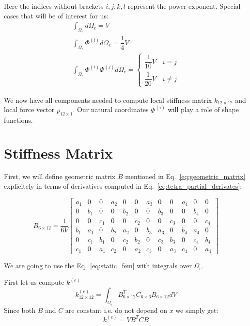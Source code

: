 \documentclass[en]{minipw} %
\begin{document}
Here the indices without brackets $i,j,k,l$ represent the power exponent.
Special cases that will be of interest for us:
\begin{equation}
\label{eq:anal_intergral}
\begin{aligned}
\int_{\Omega_{e}} d \Omega_{e} = V
\\
\int_{\Omega_{e}} \Phi^{(i)} d \Omega_{e} = \dfrac{1}{4}V
\\
\int_{\Omega_{e}} \Phi^{(i)} \Phi^{(j)} d \Omega_{e} = 
\begin{cases}
\dfrac{1}{10} V \quad i = j 
\\
\dfrac{1}{20} V \quad i \neq j
\end{cases}
\end{aligned}
\end{equation}

We now have all components needed to compute local stiffness matrix $k_{12 \times 12}$ and local force vector $p_{12 \times 1}$. Our natural coordinates $\Phi^{(i)}$ will play a role of shape functions.

\section{Stiffness Matrix}

First, we will define geometric matrix $B$ mentioned in Eq.~\ref{eq:geometric_matrix} explicitely in terms of derivatives computed in Eq.~\ref{eq:tetra_partial_derivates}:

\begin{equation}
\label{eq:geometric_matrix}
B_{6 \times 12} = \dfrac{1}{6V}
\begin{bmatrix}
a_1 & 0 & 0 & a_2 & 0 & 0 & a_3 & 0 & 0 & a_4 & 0 & 0 \\
0 & b_1 & 0 & 0 & b_2 & 0 & 0 & b_3 & 0 & 0 & b_4 & 0 \\
0 & 0 & c_1 & 0 & 0 & c_2 & 0 & 0 & c_3 & 0 & 0 & c_4 \\
b_1 & a_1 & 0 & b_2 & a_2 & 0 & b_3 & a_3 & 0 & b_4 & a_4 & 0 \\
0 & c_1 & b_1 & 0 & c_2 & b_2 & 0 & c_3 & b_3 & 0 & c_4 & b_4 \\
c_1 & 0 & a_1 & c_2 & 0 & a_2 & c_3 & 0 & a_3 & c_4 & 0 & a_4
\end{bmatrix}
\end{equation}

We are going to use the Eq.~\ref{eq:static_fem} with integrals over $\Omega_{e}$. 

First let us compute $k^{(e)}$
\begin{equation}
k^{(e)}_{12 \times 12} = \int_{\Omega_{e}} B^{T}_{6 \times 12} C_{6 \times 6} B_{6 \times 12} dV 
\end{equation}
Since both $B$ and $C$ are constant i.e. do not depend on $x$ we simply get:
\begin{equation}
k^{(e)} = V B^{T} C B 
\end{equation}
\end{document}
